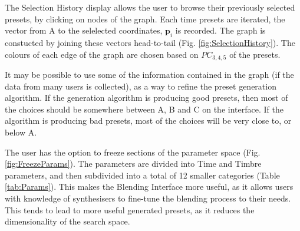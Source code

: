\documentclass[11pt, oneside]{report}   	%
\renewcommand{\vec}[1]{\mathbf{#1}}
\begin{document}
The Selection History display allows the user to browse their previously selected presets, by clicking on nodes of the graph. Each time presets are iterated, the vector from A to the selelected coordinates, $\vec{p}_i$ is recorded. The graph is constucted by joining these vectors head-to-tail (Fig. \ref{fig:SelectionHistory}). The colours of each edge of the graph are chosen based on $PC_{3,4,5}$ of the presets. 

It may be possible to use some of the information contained in the graph (if the data from many users is collected), as a way to refine the preset generation algorithm. If the generation algorithm is producing good presets, then most of the choices should be somewhere between A, B and C on the interface. If the algorithm is producing bad presets, most of the choices will be very close to, or below A.

The user has the option to freeze sections of the parameter space (Fig. \ref{fig:FreezeParams}). The parameters are divided into Time and Timbre parameters, and then subdivided into a total of 12 smaller categories (Table \ref{tab:Params}). This makes the Blending Interface more useful, as it allows users with knowledge of synthesisers to fine-tune the blending process to their needs. This tends to lead to more useful generated presets, as it reduces the dimensionality of the search space.
\end{document}
